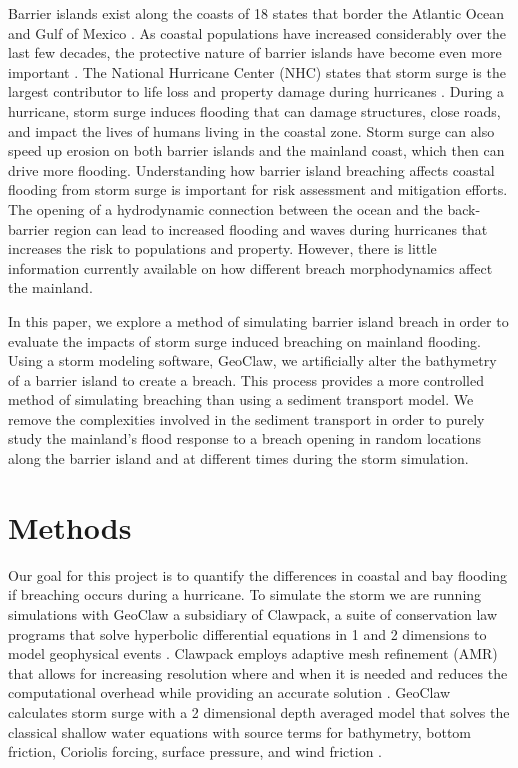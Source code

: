 \documentclass{coastal_paper}
\begin{document}
Barrier islands exist along the coasts of 18 states that border the Atlantic Ocean and Gulf of Mexico \citep{Zhang2011}. As coastal populations have increased considerably over the last few decades, the protective nature of barrier islands have become even more important \citep{Zhang2011}. The National Hurricane Center (NHC) states that storm surge  is the largest contributor to life loss and property damage during hurricanes \citep{Center2006}. During a hurricane, storm surge induces flooding that can damage structures, close roads, and impact the lives of humans living in the coastal zone. Storm surge can also speed up erosion on both barrier islands and the mainland coast, which then can drive more flooding. Understanding how barrier island breaching affects coastal flooding from storm surge is important for risk assessment and mitigation efforts. The opening of a hydrodynamic connection between the ocean and the back-barrier region can lead to increased flooding and waves during hurricanes that increases the risk to populations and property. However, there is little information currently available on how different breach morphodynamics affect the mainland.

In this paper, we explore a method of simulating barrier island breach in order to evaluate the impacts of storm surge induced breaching on mainland flooding. Using a storm modeling software, GeoClaw, we artificially alter the bathymetry of a barrier island to create a breach. This process provides a more controlled method of simulating breaching than using a sediment transport model. We remove the complexities involved in the sediment transport in order to purely study the mainland's flood response to a breach opening in random locations along the barrier island and at different times during the storm simulation. 

\section{Methods}

Our goal for this project is to quantify the differences in coastal and bay flooding if breaching occurs during a hurricane. To simulate the storm we are running simulations with GeoClaw a subsidiary of Clawpack, a suite of conservation law programs that solve hyperbolic differential equations in 1 and 2 dimensions to model geophysical events \citep{clawpack, mandli2016clawpack}. Clawpack employs adaptive mesh refinement (AMR) that allows for increasing resolution where and when it is needed and reduces the computational overhead while providing an accurate solution \citep{Berger2011TheRefinement}. GeoClaw calculates storm surge with a 2 dimensional depth averaged model that solves the classical shallow water equations with source terms for bathymetry, bottom friction, Coriolis forcing, surface pressure, and wind friction \citep{Mandli2014}. 
\end{document}
